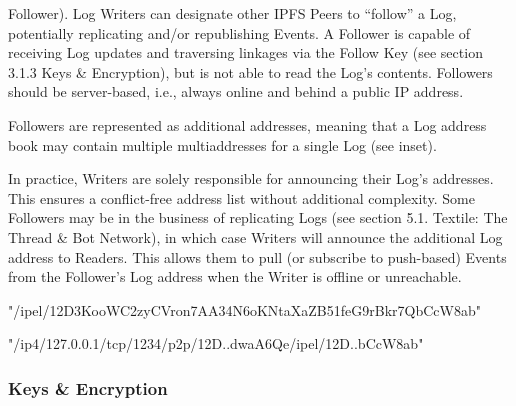 \documentclass{comjnl}
\begin{document}
\begin{definition}Follower). Log Writers can designate other IPFS Peers to “follow” a Log, potentially replicating and/or republishing Events. A Follower is capable of receiving Log updates and traversing linkages via the Follow Key (see section 3.1.3 Keys \& Encryption), but is not able to read the Log’s contents. Followers should be server-based, i.e., always online and behind a public IP address.\end{definition}

Followers are represented as additional addresses, meaning that a Log address book may contain multiple multiaddresses for a single Log (see inset).

In practice, Writers are solely responsible for announcing their Log’s addresses. This ensures a conflict-free address list without additional complexity. Some Followers may be in the business of replicating Logs (see section 5.1. Textile: The Thread \& Bot Network), in which case Writers will announce the additional Log address to Readers. This allows them to pull (or subscribe to push-based) Events from the Follower’s Log address when the Writer is offline or unreachable.

\begin{strip}
\begin{tcolorbox}[title=Log Multiaddress]
"/ipel/12D3KooWC2zyCVron7AA34N6oKNtaXaZB51feG9rBkr7QbCcW8ab"
\end{tcolorbox}
\end{strip}

\begin{strip}
\begin{tcolorbox}[title=Log IPEL Multiaddress]
"/ip4/127.0.0.1/tcp/1234/p2p/12D..dwaA6Qe/ipel/12D..bCcW8ab"
\end{tcolorbox}
\end{strip}

\begin{strip}
\begin{tcolorbox}
\end{tcolorbox}
\end{strip}

\subsubsection{Keys \& Encryption}
\end{document}
